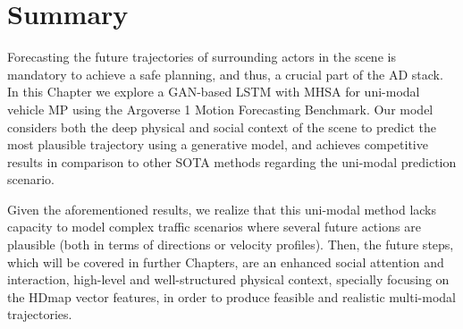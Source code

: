 \section{Summary}
\label{sec:5_summary}

Forecasting the future trajectories of surrounding actors in the scene is mandatory to achieve a safe planning, and thus, a crucial part of the \ac{AD} stack. In this Chapter we explore a \ac{GAN}-based \ac{LSTM} with \ac{MHSA} for uni-modal vehicle \ac{MP} using the Argoverse 1 Motion Forecasting Benchmark. Our model considers both the deep physical and social context of the scene to predict the most plausible trajectory using a generative model, and achieves competitive results in comparison to other \ac{SOTA} methods regarding the uni-modal prediction scenario. 

Given the aforementioned results, we realize that this uni-modal method lacks capacity to model complex traffic scenarios where several future actions are plausible (both in terms of directions or velocity profiles). Then, the future steps, which will be covered in further Chapters, are an enhanced social attention and interaction, high-level and well-structured physical context, specially focusing on the \ac{HDmap} vector features, in order to produce feasible and realistic multi-modal trajectories.